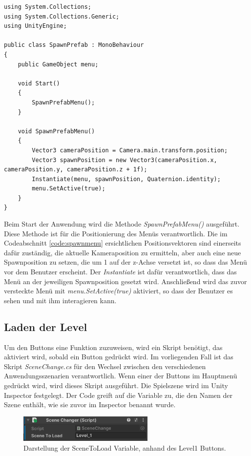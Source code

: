 \begin{lstlisting}[style=csharp, caption=Menüinstanzierung bei Neuladen., label=code:spawnmenu]
using System.Collections;
using System.Collections.Generic;
using UnityEngine;

public class SpawnPrefab : MonoBehaviour
{
    public GameObject menu;

    void Start()
    {
        SpawnPrefabMenu();
    }

    void SpawnPrefabMenu()
    {
        Vector3 cameraPosition = Camera.main.transform.position;
        Vector3 spawnPosition = new Vector3(cameraPosition.x, cameraPosition.y, cameraPosition.z + 1f);
        Instantiate(menu, spawnPosition, Quaternion.identity);
        menu.SetActive(true);
    }
}
\end{lstlisting}

Beim Start der Anwendung wird die Methode \textit{SpawnPrefabMenu()} ausgeführt. Diese Methode ist für die Positionierung
des Menüs verantwortlich. Die im Codeabschnitt \ref{code:spawnmenu} ersichtlichen Positionsvektoren sind einerseits dafür
zuständig, die aktuelle Kameraposition zu ermitteln, aber auch eine neue Spawnposition zu setzen, die um 1 auf der z-Achse
versetzt ist, so dass das Menü vor dem Benutzer erscheint. Der \textit{Instantiate} ist dafür verantwortlich, dass das Menü
an der jeweiligen Spawnposition gesetzt wird. Anschließend wird das zuvor versteckte Menü mit \textit{menu.SetActive(true)}
aktiviert, so dass der Benutzer es sehen und mit ihm interagieren kann.

\subsection{Laden der Level}
Um den Buttons eine Funktion zuzuweisen, wird ein Skript benötigt, das aktiviert wird, sobald ein Button gedrückt wird.
Im vorliegenden Fall ist das Skript \textit{SceneChange.cs} für den Wechsel zwischen den verschiedenen Anwendungsszenarien verantwortlich.
Wenn einer der Buttons im Hauptmenü gedrückt wird, wird dieses Skript ausgeführt. Die Spielszene wird im Unity Inspector
festgelegt. Der Code greift auf die Variable zu, die den Namen der Szene enthält, wie sie zuvor im Inspector benannt wurde.

\begin{figure}[H]
    \centering
    \includegraphics[width=0.6\textwidth]{images/sceneToLoad.png}
    \caption{Darstellung der SceneToLoad Variable, anhand des Level1 Buttons.}
    \label{fig:scenetoload}
\end{figure}

